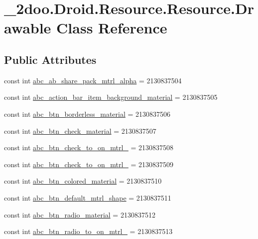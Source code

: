 \hypertarget{class__2doo_1_1_droid_1_1_resource_1_1_drawable}{
\section{\_\-2doo.Droid.Resource.Resource.Drawable Class Reference}
\label{class__2doo_1_1_droid_1_1_resource_1_1_drawable}
}
\subsection*{Public Attributes}
\begin{CompactItemize}
\item 
const int \hyperlink{class__2doo_1_1_droid_1_1_resource_1_1_drawable_0ad2647331299c69a07fb46a64c969d5}{abc\_\-ab\_\-share\_\-pack\_\-mtrl\_\-alpha} = 2130837504
\item 
const int \hyperlink{class__2doo_1_1_droid_1_1_resource_1_1_drawable_c400b508491b8e0cfe1831ea1232239b}{abc\_\-action\_\-bar\_\-item\_\-background\_\-material} = 2130837505
\item 
const int \hyperlink{class__2doo_1_1_droid_1_1_resource_1_1_drawable_028c0661c1f18132ca320c1b40d71338}{abc\_\-btn\_\-borderless\_\-material} = 2130837506
\item 
const int \hyperlink{class__2doo_1_1_droid_1_1_resource_1_1_drawable_5a23876c5cbb3fb1760f7439ce84e98b}{abc\_\-btn\_\-check\_\-material} = 2130837507
\item 
const int \hyperlink{class__2doo_1_1_droid_1_1_resource_1_1_drawable_aedff7d279b54292747b8153db442b8b}{abc\_\-btn\_\-check\_\-to\_\-on\_\-mtrl\_} = 2130837508
\item 
const int \hyperlink{class__2doo_1_1_droid_1_1_resource_1_1_drawable_5c5a0d9c8f6c74e9c97733d4d948680f}{abc\_\-btn\_\-check\_\-to\_\-on\_\-mtrl\_} = 2130837509
\item 
const int \hyperlink{class__2doo_1_1_droid_1_1_resource_1_1_drawable_55f4f323c0852a200b69d29df14d639d}{abc\_\-btn\_\-colored\_\-material} = 2130837510
\item 
const int \hyperlink{class__2doo_1_1_droid_1_1_resource_1_1_drawable_300fe3cb8e2fb2297422435ab700a86f}{abc\_\-btn\_\-default\_\-mtrl\_\-shape} = 2130837511
\item 
const int \hyperlink{class__2doo_1_1_droid_1_1_resource_1_1_drawable_37bc5317ea3e1869b9a435c257501246}{abc\_\-btn\_\-radio\_\-material} = 2130837512
\item 
const int \hyperlink{class__2doo_1_1_droid_1_1_resource_1_1_drawable_72c93478b92fb06aa706d795500dabf6}{abc\_\-btn\_\-radio\_\-to\_\-on\_\-mtrl\_} = 2130837513

\end{CompactItemize}
